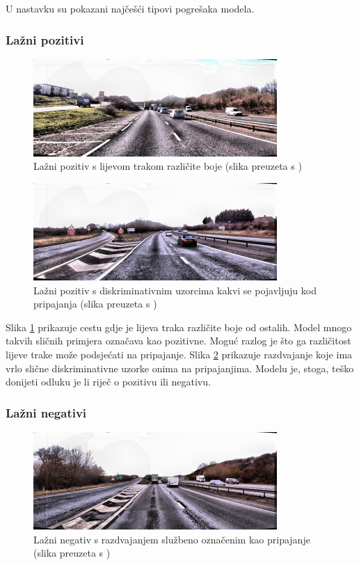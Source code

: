 \documentclass[times, utf8, diplomski, numeric]{fer}
\begin{document}
U nastavku su pokazani najčešći tipovi pogrešaka modela.

\subsubsection{Lažni pozitivi }
\begin{figure}[H]
\centering
\includegraphics[scale=1]{images/fp_1.png}
\caption{Lažni pozitiv s lijevom trakom različite boje (slika preuzeta s \citep{url:ftts_irap})}
\label{img:fp_1}
\end{figure}

\begin{figure}[H]
\centering
\includegraphics[scale=1]{images/fp_2.png}
\caption{Lažni pozitiv s diskriminativnim uzorcima kakvi se pojavljuju kod pripajanja (slika preuzeta s \citep{url:ftts_irap})}
\label{img:fp_2}
\end{figure}

Slika \ref{img:fp_1} prikazuje cestu gdje je lijeva traka različite boje od ostalih. 
Model mnogo takvih sličnih primjera označava kao pozitivne. Moguć razlog je što ga različitost lijeve trake može podsjećati na pripajanje.
Slika \ref{img:fp_2} prikazuje razdvajanje koje ima vrlo slične diskriminativne uzorke onima na pripajanjima. 
Modelu je, stoga, teško donijeti odluku je li riječ o pozitivu ili negativu.

\subsubsection{Lažni negativi }
\begin{figure}[H]
\centering
\includegraphics[scale=1]{images/fn_1.png}
\caption{Lažni negativ s razdvajanjem službeno označenim kao pripajanje (slika preuzeta s \citep{url:ftts_irap})}
\label{img:fn_1}
\end{figure}
\end{document}
